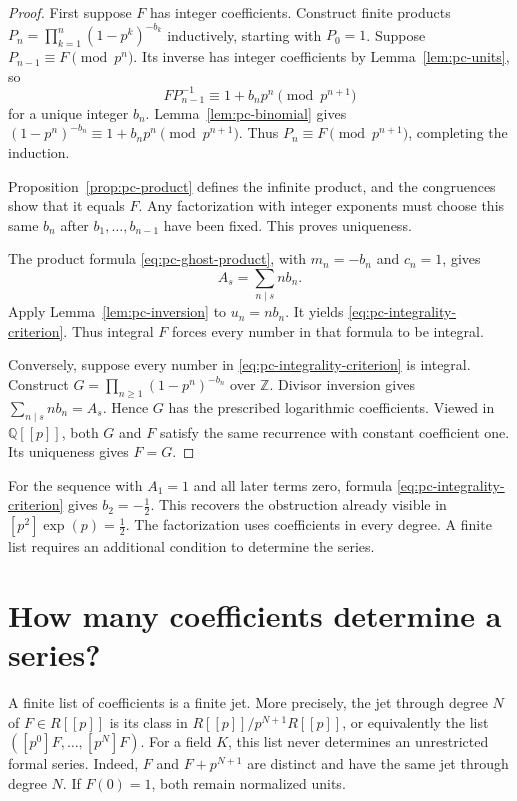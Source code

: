 \begin{proof}
First suppose $F$ has integer coefficients. Construct finite products
$P_n=\prod_{k=1}^n(1-p^k)^{-b_k}$ inductively, starting with $P_0=1$.
Suppose $P_{n-1}\equiv F\pmod{p^n}$.
Its inverse has integer coefficients by Lemma~\ref{lem:pc-units}, so
\[
 F P_{n-1}^{-1}\equiv1+b_n p^n\pmod{p^{n+1}}
\]
for a unique integer $b_n$.
Lemma~\ref{lem:pc-binomial} gives
$(1-p^n)^{-b_n}\equiv1+b_n p^n\pmod{p^{n+1}}$.
Thus $P_n\equiv F\pmod{p^{n+1}}$, completing the induction.

Proposition~\ref{prop:pc-product} defines the infinite product, and the
congruences show that it equals $F$.
Any factorization with integer exponents must choose this same $b_n$
after $b_1,\ldots,b_{n-1}$ have been fixed. This proves uniqueness.

The product formula \eqref{eq:pc-ghost-product}, with $m_n=-b_n$ and
$c_n=1$, gives
\[
 A_s=\sum_{n\mid s}n b_n.
\]
Apply Lemma~\ref{lem:pc-inversion} to $u_n=n b_n$.
It yields \eqref{eq:pc-integrality-criterion}. Thus integral $F$ forces
every number in that formula to be integral.

Conversely, suppose every number in \eqref{eq:pc-integrality-criterion}
is integral. Construct $G=\prod_{n\geq1}(1-p^n)^{-b_n}$ over $\mathbb Z$.
Divisor inversion gives $\sum_{n\mid s}n b_n=A_s$.
Hence $G$ has the prescribed logarithmic coefficients.
Viewed in $\mathbb Q[[p]]$, both $G$ and $F$ satisfy the same recurrence
with constant coefficient one. Its uniqueness gives $F=G$.
\end{proof}

For the sequence with $A_1=1$ and all later terms zero,
formula \eqref{eq:pc-integrality-criterion} gives $b_2=-\tfrac12$.
This recovers the obstruction already visible in $[p^2]\exp(p)=\tfrac12$.
The factorization uses coefficients in every degree.
A finite list requires an additional condition to determine the series.

\section{How many coefficients determine a series?}

A finite list of coefficients is a finite jet.
More precisely, the jet through degree $N$ of $F\in R[[p]]$ is its class
in $R[[p]]/p^{N+1}R[[p]]$, or equivalently the list
$([p^0]F,\ldots,[p^N]F)$.
For a field $K$, this list never determines an unrestricted formal series.
Indeed, $F$ and $F+p^{N+1}$ are distinct and have the same jet through
degree $N$. If $F(0)=1$, both remain normalized units.

